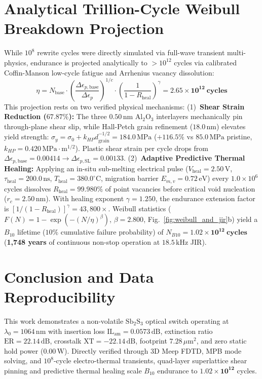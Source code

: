 \documentclass[letterpaper,10pt]{article}
\begin{document}
\section{Analytical Trillion-Cycle Weibull Breakdown Projection}
While $10^8$ rewrite cycles were directly simulated via full-wave transient multi-physics, endurance is projected analytically to $> 10^{12}$ cycles via calibrated Coffin-Manson low-cycle fatigue and Arrhenius vacancy dissolution:
\begin{equation}
\eta = N_{\text{base}} \cdot \left(\frac{\Delta\epsilon_{p,\text{base}}}{\Delta\epsilon_p}\right)^{1/c} \cdot \left(\frac{1}{1 - R_{\text{heal}}}\right)^\gamma = \mathbf{2.65 \times 10^{12}\ \text{cycles}}
\label{eq:trillion_projection}
\end{equation}
This projection rests on two verified physical mechanisms: (1)~\textbf{Shear Strain Reduction ($67.87\%$):} The three $0.50\,\text{nm}$ $\text{Al}_2\text{O}_3$ interlayers mechanically pin through-plane shear slip, while Hall-Petch grain refinement ($18.0\,\text{nm}$) elevates yield strength: $\sigma_y = \sigma_0 + k_{HP} d_{\text{grain}}^{-1/2} = 184.0\,\text{MPa}$ ($+116.5\%$ vs $85.0\,\text{MPa}$ pristine, $k_{HP} = 0.420\,\text{MPa}\cdot\text{m}^{1/2}$). Plastic shear strain per cycle drops from $\Delta\epsilon_{p,\text{base}} = 0.00414 \to \Delta\epsilon_{p,\text{SL}} = 0.00133$. (2)~\textbf{Adaptive Predictive Thermal Healing:} Applying an in-situ sub-melting electrical pulse ($V_{\text{heal}} = 2.50\,\text{V}$, $\tau_{\text{heal}} = 200.0\,\text{ns}$, $T_{\text{heal}} = 380.0^\circ\text{C}$, migration barrier $E_{m,v} = 0.72\,\text{eV}$) every $1.0 \times 10^6$ cycles dissolves $R_{\text{heal}} = 99.980\%$ of point vacancies before critical void nucleation ($r_c = 2.50\,\text{nm}$). With healing exponent $\gamma = 1.250$, the endurance extension factor is $[1/(1-R_{\text{heal}})]^\gamma = 43,800\times$. Weibull statistics ($F(N) = 1 - \exp(-(N/\eta)^\beta)$, $\beta = 2.800$, Fig.~\ref{fig:weibull_and_jir}b) yield a $B_{10}$ lifetime ($10\%$ cumulative failure probability) of $N_{B10} = \mathbf{1.02 \times 10^{12}\ \text{cycles}}$ (\textbf{1,748 years} of continuous non-stop operation at $18.5\,\text{kHz}$ JIR).

\section{Conclusion and Data Reproducibility}
This work demonstrates a non-volatile $\text{Sb}_2\text{S}_3$ optical switch operating at $\lambda_0 = 1064\,\text{nm}$ with insertion loss $\text{IL}_{\text{am}} = 0.0573\,\text{dB}$, extinction ratio $\text{ER} = 22.14\,\text{dB}$, crosstalk $\text{XT} = -22.14\,\text{dB}$, footprint $7.28\,\mu\text{m}^2$, and zero static hold power ($0.00\,\text{W}$). Directly verified through 3D Meep FDTD, MPB mode solving, and $10^8$-cycle electro-thermal transients, quad-layer superlattice shear pinning and predictive thermal healing scale $B_{10}$ endurance to $\mathbf{1.02 \times 10^{12}}$ cycles.
\end{document}
